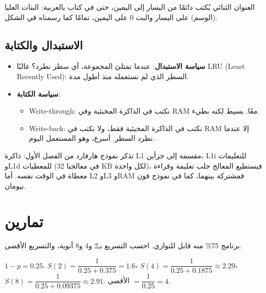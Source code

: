 \begin{intabih}
    العنوان الثنائي يُكتب دائمًا من اليسار إلى اليمين، حتى في كتاب بالعربية: البتات العليا (الوسم) على اليسار
    والبت 0 على اليمين، تمامًا كما رسمناه في الشكل.
\end{intabih}

\subsection{الاستبدال والكتابة}
\begin{itemize}
    \item \textbf{سياسة الاستبدال}: عندما تمتلئ المجموعة، أي سطر نطرد؟ غالبًا \textenglish{LRU} \textenglish{(Least Recently Used)}:
          السطر الذي لم نستعمله منذ أطول مدة.
    \item \textbf{سياسة الكتابة}:
    \begin{itemize}
        \item \textenglish{Write-through}: نكتب في الذاكرة المخبئية وفي \textenglish{RAM} معًا. بسيط لكنه بطيء.
        \item \textenglish{Write-back}: نكتب في الذاكرة المخبئية فقط، ولا نكتب في \textenglish{RAM} إلا عندما نطرد السطر. أسرع، وهو المستعمل اليوم.
    \end{itemize}
\end{itemize}

\begin{hal}
    تذكر نموذج هارفارد من الفصل الأول: ذاكرة \textenglish{L1} مقسمة إلى جزأين، \textenglish{L1i} للتعليمات
    و\textenglish{L1d} للمعطيات (في معالجنا \textenglish{32 KB} لكل واحدة)، فيستطيع المعالج جلب تعليمة وقراءة معطاة
    في الوقت نفسه. أما \textenglish{L2} و\textenglish{L3} و\textenglish{RAM} فمشتركة بينهما، كما في نموذج فون نيومان.
\end{hal}

\section{تمارين}

\begin{tamrin}
    برنامج 75\% منه قابل للتوازي. احسب التسريع بـ2 و4 و8 أنوية، والتسريع الأقصى.
\end{tamrin}
\begin{hall}
    $1 - p = 0.25$. \quad $S(2) = \dfrac{1}{0.25 + 0.375} = 1.6$، \quad $S(4) = \dfrac{1}{0.25 + 0.1875} \approx 2.29$،
    \quad $S(8) = \dfrac{1}{0.25 + 0.09375} \approx 2.91$. الأقصى $= \dfrac{1}{0.25} = 4$.
\end{hall}

